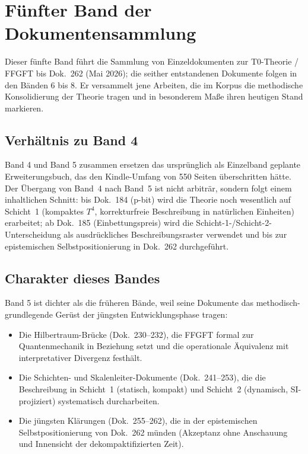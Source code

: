 
\section*{Fünfter Band der Dokumentensammlung}

Dieser fünfte Band führt die Sammlung von Einzeldokumenten zur T0-Theorie
/ FFGFT bis Dok.~262 (Mai 2026); die seither entstandenen Dokumente folgen
in den Bänden 6 bis 8. Er versammelt jene Arbeiten, die im Korpus die methodische
Konsolidierung der Theorie tragen und in besonderem Maße ihren heutigen
Stand markieren.

\subsection*{Verhältnis zu Band 4}

Band 4 und Band 5 zusammen ersetzen das ursprünglich als Einzelband geplante
Erweiterungsbuch, das den Kindle-Umfang von 550 Seiten überschritten hätte.
Der Übergang von Band~4 nach Band~5 ist nicht arbiträr, sondern folgt einem
inhaltlichen Schnitt: bis Dok.~184 (p-bit) wird die Theorie noch wesentlich
auf Schicht~1 (kompaktes $T^4$, korrekturfreie Beschreibung in natürlichen
Einheiten) erarbeitet; ab Dok.~185 (Einbettungspreis) wird die
Schicht-1-/Schicht-2-Unterscheidung als ausdrückliches Beschreibungsraster
verwendet und bis zur epistemischen Selbstpositionierung in Dok.~262
durchgeführt.

\subsection*{Charakter dieses Bandes}

Band 5 ist dichter als die früheren Bände, weil seine Dokumente das
methodisch-grundlegende Gerüst der jüngsten Entwicklungsphase tragen:
\begin{itemize}
\item Die Hilbertraum-Brücke (Dok.~230--232), die FFGFT formal zur
      Quantenmechanik in Beziehung setzt und die operationale Äquivalenz
      mit interpretativer Divergenz festhält.
\item Die Schichten- und Skalenleiter-Dokumente (Dok.~241--253), die die
      Beschreibung in Schicht~1 (statisch, kompakt) und Schicht~2 (dynamisch,
      SI-projiziert) systematisch durcharbeiten.
\item Die jüngsten Klärungen (Dok.~255--262), die in der epistemischen
      Selbstpositionierung von Dok.~262 münden (Akzeptanz ohne Anschauung
      und Innensicht der dekompaktifizierten Zeit).
\end{itemize}


